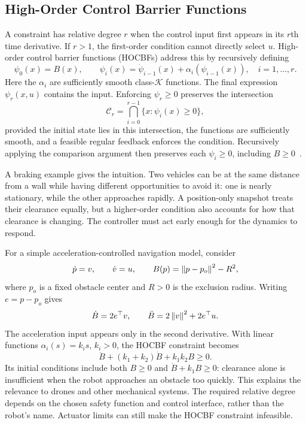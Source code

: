 \subsection{High-Order Control Barrier Functions}
A constraint has relative degree $r$ when the control input first appears in its $r$th time derivative. If $r>1$, the first-order condition cannot directly select $u$. High-order control barrier functions (HOCBFs) address this by recursively defining~\cite{litXiao2019}
\begin{equation}
\psi_0(x)=B(x),\qquad
\psi_i(x)=\dot\psi_{i-1}(x)+\alpha_i(\psi_{i-1}(x)),
\quad i=1,\ldots,r.
\end{equation}
Here the $\alpha_i$ are sufficiently smooth class-$\mathcal K$ functions. The final expression $\psi_r(x,u)$ contains the input. Enforcing $\psi_r\geq0$ preserves the intersection
\begin{equation}
\mathcal C_r=\bigcap_{i=0}^{r-1}\{x:\psi_i(x)\geq0\},
\end{equation}
provided the initial state lies in this intersection, the functions are sufficiently smooth, and a feasible regular feedback enforces the condition. Recursively applying the comparison argument then preserves each $\psi_i\geq0$, including $B\geq0$~\cite{litXiao2019}.

A braking example gives the intuition. Two vehicles can be at the same distance from a wall while having different opportunities to avoid it: one is nearly stationary, while the other approaches rapidly. A position-only snapshot treats their clearance equally, but a higher-order condition also accounts for how that clearance is changing. The controller must act early enough for the dynamics to respond.

\clearpage
For a simple acceleration-controlled navigation model, consider
\begin{equation}
\dot p=v,\qquad\dot v=u,\qquad
B(p)=\left\lVert p-p_o\right\rVert^2-R^2,
\end{equation}
where $p_o$ is a fixed obstacle center and $R>0$ is the exclusion radius. Writing $e=p-p_o$ gives
\begin{equation}
\dot B=2e^\top v,\qquad
\ddot B=2\left\lVert v\right\rVert^2+2e^\top u.
\end{equation}
The acceleration input appears only in the second derivative. With linear functions $\alpha_i(s)=k_i s$, $k_i>0$, the HOCBF constraint becomes
\begin{equation}
\ddot B+(k_1+k_2)\dot B+k_1k_2B\geq0.
\label{eq:hocbfsecondorder}
\end{equation}
Its initial conditions include both $B\geq0$ and $\dot B+k_1B\geq0$: clearance alone is insufficient when the robot approaches an obstacle too quickly. This explains the relevance to drones and other mechanical systems. The required relative degree depends on the chosen safety function and control interface, rather than the robot's name. Actuator limits can still make the HOCBF constraint infeasible.

